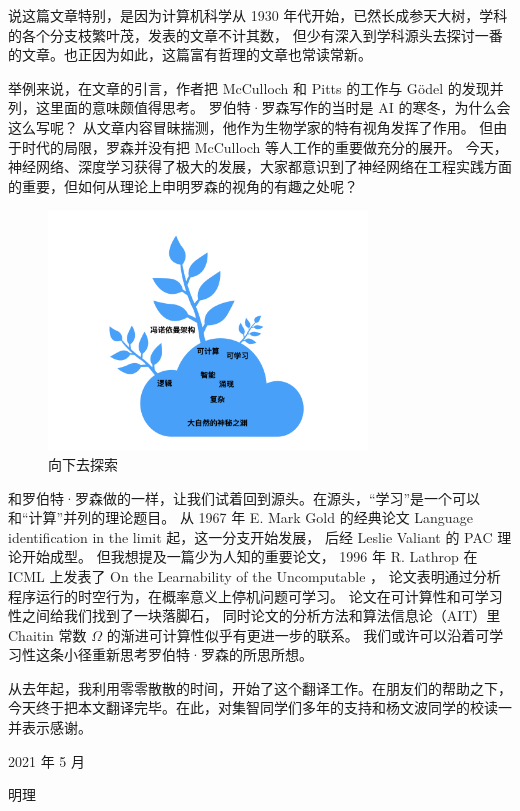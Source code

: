 \documentclass[a4paper,12pt]{article}
\begin{document}
说这篇文章特别，是因为计算机科学从 1930 年代开始，已然长成参天大树，学科的各个分支枝繁叶茂，发表的文章不计其数，
但少有深入到学科源头去探讨一番的文章。也正因为如此，这篇富有哲理的文章也常读常新。

举例来说，在文章的引言，作者把 McCulloch 和 Pitts 的工作与 G{\"o}del 的发现并列，这里面的意味颇值得思考。
罗伯特·罗森写作的当时是 AI 的寒冬，为什么会这么写呢？ 从文章内容冒昧揣测，他作为生物学家的特有视角发挥了作用。
但由于时代的局限，罗森并没有把 McCulloch 等人工作的重要做充分的展开。
今天，神经网络、深度学习获得了极大的发展，大家都意识到了神经网络在工程实践方面的重要，但如何从理论上申明罗森的视角的有趣之处呢？

\begin{figure}[ht]
\centering
\includegraphics[height=2.5in]{images/landscape.png}
\caption{向下去探索}
\end{figure}

和罗伯特·罗森做的一样，让我们试着回到源头。在源头，“学习”是一个可以和“计算”并列的理论题目。
从 1967 年 E. Mark Gold 的经典论文 Language identification in the limit 起，这一分支开始发展， 后经 Leslie Valiant 的 PAC 理论开始成型。
但我想提及一篇少为人知的重要论文， 1996 年 R. Lathrop 在 ICML 上发表了 On the Learnability of the Uncomputable ，
论文表明通过分析程序运行的时空行为，在概率意义上停机问题可学习。 论文在可计算性和可学习性之间给我们找到了一块落脚石，
同时论文的分析方法和算法信息论（AIT）里 Chaitin 常数 $\Omega$ 的渐进可计算性似乎有更进一步的联系。
我们或许可以沿着可学习性这条小径重新思考罗伯特·罗森的所思所想。

从去年起，我利用零零散散的时间，开始了这个翻译工作。在朋友们的帮助之下，今天终于把本文翻译完毕。在此，对集智同学们多年的支持和杨文波同学的校读一并表示感谢。

\hfill \hfill 2021 年 5 月

\hfill \hfill 明理
\end{document}
